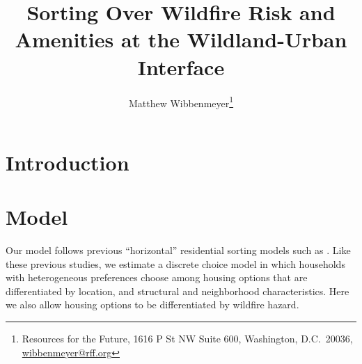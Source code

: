 \documentclass[10pt]{article}
\begin{document}
\title{{\bf  Sorting Over Wildfire Risk and Amenities at the Wildland-Urban Interface}}
\author{Matthew Wibbenmeyer\thanks{Resources for the Future, 1616 P St NW Suite 600, Washington, D.C.\ 20036, \href{mailto:wibbenmeyer@rff.org}{wibbenmeyer@rff.org}}}


\maketitle

\section{Introduction}

\section{Model}

Our model follows previous ``horizontal'' residential sorting models such as \citet{bayer2007,klaiberphaneuf,bakkensenma}. Like these previous studies, we estimate a discrete choice model in which households with heterogeneous preferences choose among housing options that are differentiated by location, and structural and neighborhood characteristics. Here we also allow housing options to be differentiated by wildfire hazard. 
\end{document}
